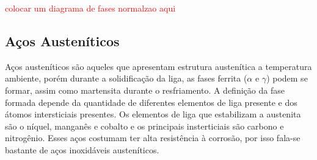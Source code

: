 \documentclass[]{politex}
\newcommand\myworries[1]{\textcolor{red}{#1}}
\begin{document}
\myworries{colocar um diagrama de fases normalzao aqui}

\subsection{Aços Austeníticos}
	Aços austeníticos são aqueles que apresentam estrutura austenítica a temperatura ambiente, porém durante a solidificação da liga, as fases ferrita ($\alpha$ e $\gamma$) podem se formar, assim como martensita durante o resfriamento. A definição da fase formada depende da quantidade de diferentes elementos de liga presente e dos átomos intersticiais presentes. Os elementos de liga que estabilizam a austenita são o níquel, manganês e cobalto e os principais insterticiais são carbono e nitrogênio.
	Esses aços costumam ter alta resistência à corrosão, por isso fala-se bastante de aços inoxidáveis austeníticos.
\end{document}
